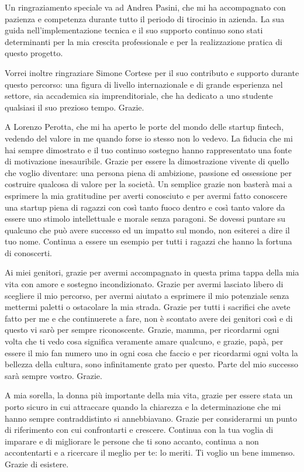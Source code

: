 \documentclass[a4paper,12pt]{report}
\begin{document}
\bigskip
Un ringraziamento speciale va ad Andrea Pasini, che mi ha accompagnato con pazienza e competenza durante tutto il periodo di tirocinio in azienda. La sua guida nell'implementazione tecnica e il suo supporto continuo sono stati determinanti per la mia crescita professionale e per la realizzazione pratica di questo progetto.

\bigskip
Vorrei inoltre ringraziare Simone Cortese per il suo contributo e supporto durante questo percorso: una figura di livello internazionale e di grande esperienza nel settore, sia accademica sia imprenditoriale, che ha dedicato a uno studente qualsiasi il suo prezioso tempo. Grazie.

\bigskip
A Lorenzo Perotta, che mi ha aperto le porte del mondo delle startup fintech, vedendo del valore in me quando forse io stesso non lo vedevo. La fiducia che mi hai sempre dimostrato e il tuo continuo sostegno hanno rappresentato una fonte di motivazione inesauribile. Grazie per essere la dimostrazione vivente di quello che voglio diventare: una persona piena di ambizione, passione ed ossessione per costruire qualcosa di valore per la società. Un semplice grazie non basterà mai a esprimere la mia gratitudine per averti conosciuto e per avermi fatto conoscere una startup piena di ragazzi con così tanto fuoco dentro e così tanto valore da essere uno stimolo intellettuale e morale senza paragoni. Se dovessi puntare su qualcuno che può avere successo ed un impatto sul mondo, non esiterei a dire il tuo nome. Continua a essere un esempio per tutti i ragazzi che hanno la fortuna di conoscerti.

\bigskip
Ai miei genitori, grazie per avermi accompagnato in questa prima tappa della mia vita con amore e sostegno incondizionato. Grazie per avermi lasciato libero di scegliere il mio percorso, per avermi aiutato a esprimere il mio potenziale senza mettermi paletti o ostacolare la mia strada. Grazie per tutti i sacrifici che avete fatto per me e che continuerete a fare, non è scontato avere dei genitori così e di questo vi sarò per sempre riconoscente. Grazie, mamma, per ricordarmi ogni volta che ti vedo cosa significa veramente amare qualcuno, e grazie, papà, per essere il mio fan numero uno in ogni cosa che faccio e per ricordarmi ogni volta la bellezza della cultura, sono infinitamente grato per questo. Parte del mio successo sarà sempre vostro. Grazie.

\bigskip
A mia sorella, la donna più importante della mia vita, grazie per essere stata un porto sicuro in cui attraccare quando la chiarezza e la determinazione che mi hanno sempre contraddistinto si annebbiavano. Grazie per considerarmi un punto di riferimento con cui confrontarti e crescere. Continua con la tua voglia di imparare e di migliorare le persone che ti sono accanto, continua a non accontentarti e a ricercare il meglio per te: lo meriti. Ti voglio un bene immenso. Grazie di esistere.
\end{document}
